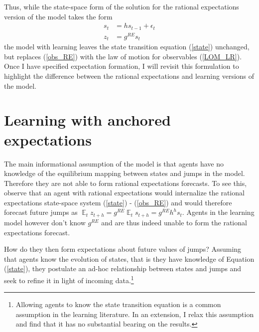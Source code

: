 \documentclass[11pt]{article}
\renewcommand{\[}{\begin{equation}}
\renewcommand{\]}{\end{equation}}
\DeclareMathOperator{\E}{\mathbb{E}}
\begin{document}
 Thus, while the state-space form of the solution for the rational expectations version of the model takes the form
 \begin{align}
 s_t & = h s_{t-1} + \epsilon_t \label{state} \\
 z_t & = g^{RE} s_t \label{obs_RE}
 \end{align}
 the model with learning leaves the state transition equation (\ref{state}) unchanged, but replaces (\ref{obs_RE}) with the law of motion for observables (\ref{LOM_LR}). Once I have specified expectation formation, I will revisit this formulation to highlight the difference between the rational expectations and learning versions of the model. 

 
 
\section{Learning with anchored expectations}\label{learning}
The main informational assumption of the model is that agents have no knowledge of the equilibrium mapping between states and jumps in the model. Therefore they are not able to form rational expectations forecasts. To see this, observe that an agent with rational expectations would internalize the rational expectations state-space system (\ref{state}) - (\ref{obs_RE}) and would therefore forecast future jumps as $\E_t z_{t+h} = g^{RE}\E_ts_{t+h} = g^{RE}h^{h}s_t$. Agents in the learning model however don't know $g^{RE}$ and are thus indeed unable to form the rational expectations forecast.

How do they then form expectations about future values of jumps? Assuming that agents know the evolution of states, that is they have knowledge of Equation (\ref{state}), they postulate an ad-hoc relationship between states and jumps and seek to refine it in light of incoming data.\footnote{Allowing agents to know the state transition equation is a common assumption in the learning literature. In an extension, I relax this assumption and find that it has no substantial bearing on the results.}
\end{document}
